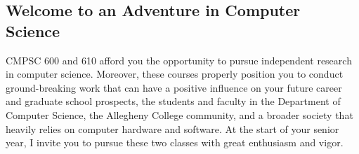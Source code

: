 \subsection*{Welcome to an Adventure in Computer Science}

CMPSC 600 and 610 afford you the opportunity to pursue independent research in computer science.  Moreover, these
courses properly position you to conduct ground-breaking work that can have a positive influence on your future career
and graduate school prospects, the students and faculty in the Department of Computer Science, the Allegheny College
community, and a broader society that heavily relies on computer hardware and software.  At the start of your senior
year, I invite you to pursue these two classes with great enthusiasm and vigor.

% 

